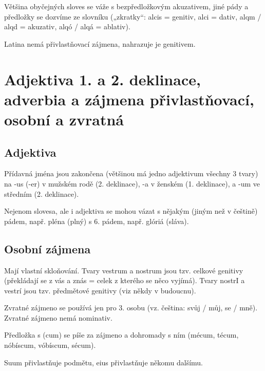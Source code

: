 \documentclass[12pt]{article}					%
\begin{document}
        Většina obyčejných sloves se váže s bezpředložkovým akuzativem, jiné pády a předložky se dozvíme ze slovníku („zkratky“: alcis = genitiv, alci = dativ, alqm / alqd = akuzativ, alqó / alqá = ablativ).

        Latina nemá přivlastňovací zájmena, nahrazuje je genitivem.

\section{Adjektiva 1. a 2. deklinace, adverbia a zájmena přivlastňovací, osobní a zvratná}
    \subsection{Adjektiva}
        Přídavná jména jsou zakončena (většinou má jedno adjektivum všechny 3 tvary) na -us (-er) v mužském rodě (2. deklinace), -a v ženském (1. deklinace), a -um ve středním (2. deklinace).


        Nejenom slovesa, ale i adjektiva se mohou vázat s nějakým (jiným než v češtině) pádem, např. pléna (plný) s 6. pádem, např. glóriá (sláva).

    \subsection{Osobní zájmena}
    Mají vlastní skloňování. Tvary vestrum a nostrum jsou tzv. celkové genitivy (překládají se z vás a znás = celek z kterého se něco vyjímá). Tvary nostrI a vestrí jsou tzv. předmětové genitivy (viz někdy v budoucnu).

    Zvratné zájmeno se používá jen pro 3. osobu (vz. čeština: svůj / můj, se / mně). Zvratné zájmeno nemá nominativ.

    Předložka s (cum) se píše za zájmeno a dohromady s ním (mécum, técum, nóbíscum, vóbíscum, sécum).

    Suum přivlastňuje podmětu, eius přivlastňuje někomu dalšímu.

\newpage
\end{document}
